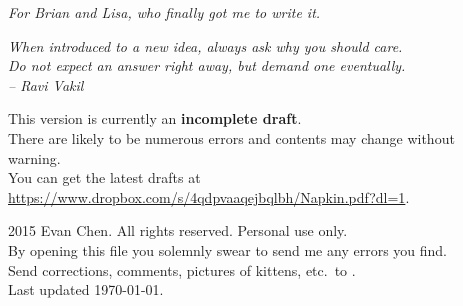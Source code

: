 \begin{titlepage}
	\vspace*{8cm}
	\begin{center}
		\itshape
		\noindent
		For Brian and Lisa, who finally got me to write it.
	\end{center}
\end{titlepage}

\begin{titlepage}
	\vspace*{8cm}
	\begin{flushright}
		\itshape\large
		When introduced to a new idea, always ask why you should care. \\[0.2cm]
		Do not expect an answer right away, but demand one eventually. \\[0.8cm]
		-- Ravi Vakil \cite{ref:vakil}
	\end{flushright}

	
	\vfill

	{
	\footnotesize
	\noindent This version is currently an \textbf{incomplete draft}. \\
	There are likely to be numerous errors and contents may change without warning. \\
	You can get the latest drafts at 
		\url{https://www.dropbox.com/s/4qdpvaaqejbqlbh/Napkin.pdf?dl=1}.
	}
	
	\vspace*{1cm}

	{
	\large
	\noindent {\copyright} 2015 Evan Chen.  All rights reserved. Personal use only. \\[0.8cm]
	By opening this file you solemnly swear to send me any errors you find. \\ [0.4cm]
	Send corrections, comments, pictures of kittens,
	etc.\ to . \\[0.8cm]
	Last updated \today.
	\vspace*{1cm}
	}

\end{titlepage}
